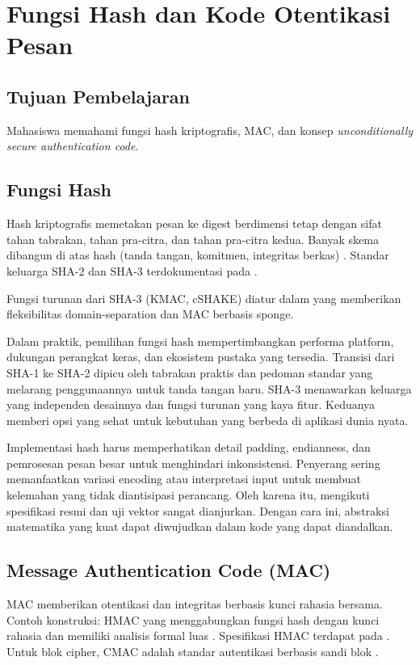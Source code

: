 \documentclass[../main.tex]{subfiles}
\begin{document}
\chapter{Fungsi Hash dan Kode Otentikasi Pesan}

\section{Tujuan Pembelajaran}
Mahasiswa memahami fungsi hash kriptografis, MAC, dan konsep \emph{unconditionally secure authentication code}.

\section{Fungsi Hash}
Hash kriptografis memetakan pesan ke digest berdimensi tetap dengan sifat tahan tabrakan, tahan pra-citra, dan tahan pra-citra kedua. Banyak skema dibangun di atas hash (tanda tangan, komitmen, integritas berkas) \citep{menezes}. Standar keluarga SHA-2 dan SHA-3 terdokumentasi pada \citep{fips180-4,fips202}.

Fungsi turunan dari SHA-3 (KMAC, cSHAKE) diatur dalam \citep{nist_sp_800_185} yang memberikan fleksibilitas domain-separation dan MAC berbasis sponge.

Dalam praktik, pemilihan fungsi hash mempertimbangkan performa platform, dukungan perangkat keras, dan ekosistem pustaka yang tersedia. Transisi dari SHA-1 ke SHA-2 dipicu oleh tabrakan praktis dan pedoman standar yang melarang penggunaannya untuk tanda tangan baru. SHA-3 menawarkan keluarga yang independen desainnya dan fungsi turunan yang kaya fitur. Keduanya memberi opsi yang sehat untuk kebutuhan yang berbeda di aplikasi dunia nyata.

Implementasi hash harus memperhatikan detail padding, endianness, dan pemrosesan pesan besar untuk menghindari inkonsistensi. Penyerang sering memanfaatkan variasi encoding atau interpretasi input untuk membuat kelemahan yang tidak diantisipasi perancang. Oleh karena itu, mengikuti spesifikasi resmi dan uji vektor sangat dianjurkan. Dengan cara ini, abstraksi matematika yang kuat dapat diwujudkan dalam kode yang dapat diandalkan.

\section{Message Authentication Code (MAC)}
MAC memberikan otentikasi dan integritas berbasis kunci rahasia bersama. Contoh konstruksi: HMAC yang menggabungkan fungsi hash dengan kunci rahasia dan memiliki analisis formal luas \citep{katzlindell}. Spesifikasi HMAC terdapat pada \citep{rfc2104}. Untuk blok cipher, CMAC adalah standar autentikasi berbasis sandi blok \citep{nist_sp_800_38b}.
\end{document}
